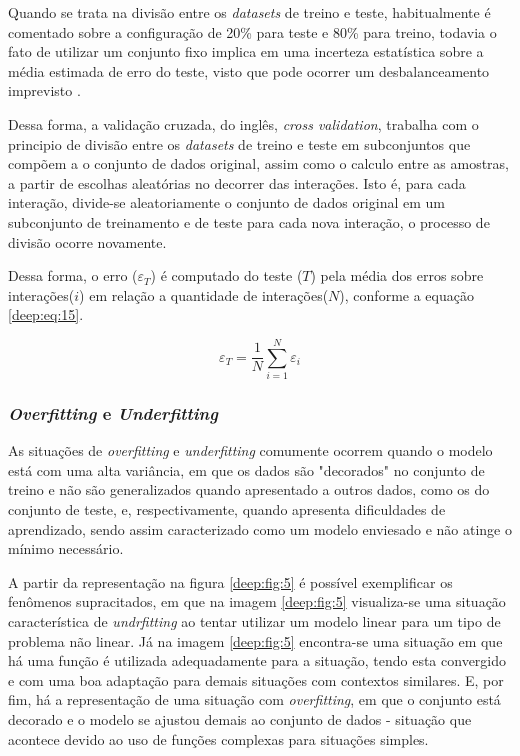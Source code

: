 Quando se trata na divisão entre os \textit{datasets} de treino e teste, habitualmente é comentado sobre a configuração de 20\% para teste e 80\% para treino, todavia o fato de utilizar um conjunto fixo implica em uma incerteza estatística sobre a média estimada de erro do teste, visto que pode ocorrer um desbalanceamento imprevisto \cite{Goodfellow2016}.

Dessa forma, a validação cruzada, do inglês, \textit{cross validation}, trabalha com o principio de divisão entre os \textit{datasets} de treino e teste em subconjuntos que compõem a o conjunto de dados original, assim como o calculo entre as amostras, a partir de escolhas aleatórias no decorrer das interações. Isto é, para cada interação, divide-se aleatoriamente o conjunto de dados original em um subconjunto de treinamento e de teste para cada nova interação, o processo de divisão ocorre novamente.

Dessa forma, o erro ($\varepsilon_T$) é computado do teste ($T$) pela média dos erros sobre interações($i$) em relação a quantidade de interações($N$), conforme a equação \ref{deep:eq:15}.

\begin{equation}
    \label{deep:eq:15}
    \varepsilon_T = \frac{1}{N} \sum_{i=1}^{N} \varepsilon_i
\end{equation}


\subsubsection{\textit{Overfitting} e \textit{Underfitting}}
\label{deep:overunder}

As situações de \textit{overfitting} e \textit{underfitting} comumente ocorrem quando o modelo está com uma alta variância, em que os dados são "decorados" no conjunto de treino e não são generalizados quando apresentado a outros dados, como os do conjunto de teste, e, respectivamente, quando apresenta dificuldades de aprendizado, sendo assim caracterizado como um modelo enviesado e não atinge o mínimo necessário.

A partir da representação na figura \ref{deep:fig:5} é possível exemplificar os fenômenos supracitados, em que na imagem \ref{deep:fig:5} visualiza-se uma situação característica de \textit{undrfitting} ao tentar utilizar um modelo linear para um tipo de problema não linear. Já na imagem \ref{deep:fig:5} encontra-se uma situação em que há uma função é utilizada adequadamente para a situação, tendo esta convergido e com uma boa adaptação para demais situações com contextos similares. E, por fim, há a representação de uma situação com \textit{overfitting}, em que o conjunto está decorado e o modelo se ajustou demais ao conjunto de dados - situação que acontece devido ao uso de funções complexas para situações simples.

